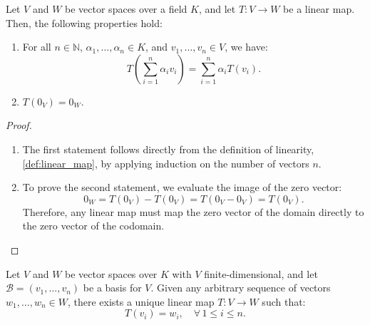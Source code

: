\begin{proposition}
\label{prop:properties_linear_maps}
Let $V$ and $W$ be vector spaces over a field $K$, and let $T: V \to W$ be a linear map. Then, the following properties hold:
\begin{enumerate}
    \item For all $n \in \mathbb{N}$, $\alpha_1, \dots, \alpha_n \in K$, and $v_1, \dots, v_n \in V$, we have:
    \[
    T\left( \sum_{i=1}^n \alpha_i v_i \right) = \sum_{i=1}^n \alpha_i T(v_i).
    \]
    \item $T(0_V) = 0_W$.
\end{enumerate}
\end{proposition}

\begin{proof}
\begin{enumerate}
    \item The first statement follows directly from the definition of linearity, \cref{def:linear_map}, by applying induction on the number of vectors $n$.
    \item To prove the second statement, we evaluate the image of the zero vector:
    \[
    0_W = T(0_V) - T(0_V) = T(0_V - 0_V) = T(0_V).
    \]
    Therefore, any linear map must map the zero vector of the domain directly to the zero vector of the codomain.
\end{enumerate}
\end{proof}

\begin{theorem}
\label{thm:existence_uniqueness_linear_map}
Let $V$ and $W$ be vector spaces over $K$ with $V$ finite-di\-men\-sional, and let $\mathcal{B} = (v_1, \dots, v_n)$ be a basis for $V$. Given any arbitrary sequence of vectors $w_1, \dots, w_n \in W$, there exists a unique linear map $T: V \to W$ such that:
\[
T(v_i) = w_i, \quad \forall \, 1 \le i \le n.
\]
\end{theorem}

